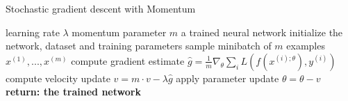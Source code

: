 \documentclass[
a4paper, 12pt, %
titlepage, 		 %
twoside,			 %
headsepline,	 %
BCOR5mm,			 %
idxtotoc, bibtotoc]{scrreprt}	%
\begin{document}
\begin{algorithm}
    \begin{algorithmic}[1]
        \caption{Stochastic gradient descent with Momentum}
        \REQUIRE learning rate $\lambda$
        \REQUIRE momentum parameter $m$
        \ENSURE a trained neural network
        \STATE initialize the network, dataset and training parameters
            \STATE sample minibatch of $m$ examples ${x^{(1)}, ... ,x^{(m)}}$
            \STATE compute gradient estimate $\hat{g}=\frac{1}{m} \nabla_\theta \sum_i L(f(x^{(i);\theta}),y^{(i)})$
            \STATE compute velocity update $v=m \cdot v - \lambda \hat{g}$
            \STATE apply parameter update $\theta=\theta-v$
        \ENDWHILE
        \STATE \textbf{return: the trained network}
    \end{algorithmic}
\end{algorithm}
\end{document}
